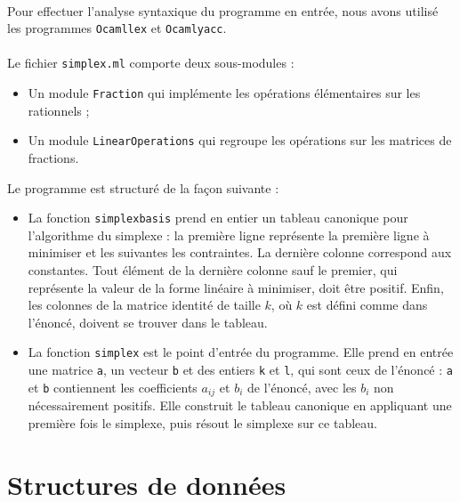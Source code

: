\documentclass[a4paper]{article}
\begin{document}
\paragraph{}

Pour effectuer l'analyse syntaxique du programme en entrée, nous avons utilisé les programmes \texttt{Ocamllex} et \texttt{Ocamlyacc}.

\paragraph{}

Le fichier \texttt{simplex.ml} comporte deux sous-modules :

\begin{itemize}
  \item Un module \texttt{Fraction} qui implémente les opérations élémentaires sur les rationnels ;
  \item Un module \texttt{LinearOperations} qui regroupe les opérations sur les matrices de fractions.
\end{itemize}

Le programme est structuré de la façon suivante :

\begin{itemize}
  \item La fonction \texttt{simplex\textunderscore basis} prend en entier un tableau canonique pour l'algorithme du simplexe : la première ligne représente la première ligne à minimiser et les suivantes les contraintes. La dernière colonne correspond aux constantes. Tout élément de la dernière colonne sauf le premier, qui représente la valeur de la forme linéaire à minimiser, doit être positif. Enfin, les colonnes de la matrice identité de taille $k$, où $k$ est défini comme dans l'énoncé, doivent se trouver dans le tableau.
  \item La fonction \texttt{simplex} est le point d'entrée du programme. Elle prend en entrée une matrice \texttt{a}, un vecteur \texttt{b} et des entiers \texttt{k} et \texttt{l}, qui sont ceux de l'énoncé : \texttt{a} et \texttt{b} contiennent les coefficients $a_{ij}$ et $b_i$ de l'énoncé, avec les $b_i$ non nécessairement positifs. Elle construit le tableau canonique en appliquant une première fois le simplexe, puis résout le simplexe sur ce tableau.
\end{itemize}

\section{Structures de données}
\end{document}
